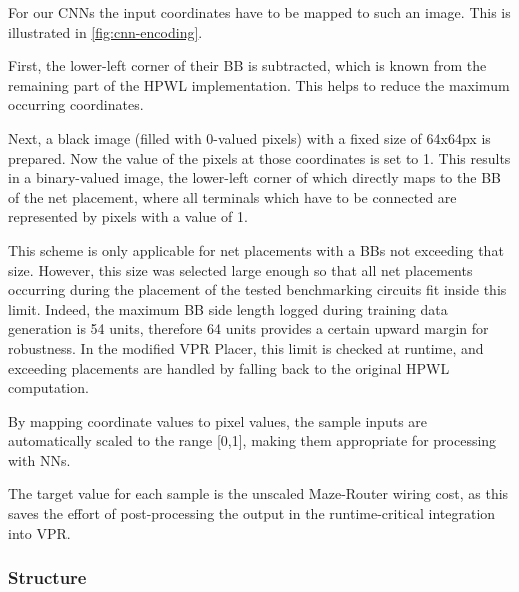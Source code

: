 For our \glspl{CNN} the input coordinates have to be mapped to such an image. This is illustrated in \ref{fig:cnn-encoding}.

First, the lower-left corner of their \gls{BB} is subtracted, which is known from the remaining part of the \gls{HPWL} implementation. This helps to reduce the maximum occurring coordinates.

Next, a black image (filled with 0-valued pixels) with a fixed size of 64x64px is prepared. Now the value of the pixels at those coordinates is set to 1. This results in a binary-valued image, the lower-left corner of which directly maps to the \gls{BB} of the net placement, where all terminals which have to be connected are represented by pixels with a value of 1.

This scheme is only applicable for net placements with a \glspl{BB} not exceeding that size. However, this size was selected large enough so that all net placements occurring during the placement of the tested benchmarking circuits fit inside this limit. Indeed, the maximum \gls{BB} side length logged during training data generation is 54 units, therefore 64 units provides a certain upward margin for robustness. In the modified \gls{VPR} Placer, this limit is checked at runtime, and exceeding placements are handled by falling back to the original \gls{HPWL} computation.

By mapping coordinate values to pixel values, the sample inputs are automatically scaled to the range [0,1], making them appropriate for processing with \glspl{NN}.

The target value for each sample is the unscaled Maze-Router wiring cost, as this saves the effort of post-processing the output in the runtime-critical integration into \gls{VPR}.\cite{TODO}

\subsubsection{Structure}\label{ch:cnn-design}

